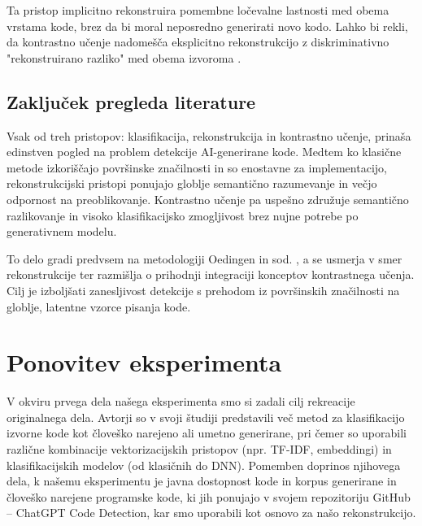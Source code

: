\documentclass[sigconf,nonacm]{acmart}
\begin{document}
Ta pristop implicitno rekonstruira pomembne ločevalne lastnosti med obema vrstama kode, brez da bi moral neposredno generirati novo kodo. Lahko bi rekli, da kontrastno učenje nadomešča eksplicitno rekonstrukcijo z diskriminativno "rekonstruirano razliko" med obema izvoroma \cite{guo2022unixcoder}.

\subsection{Zaključek pregleda literature}
Vsak od treh pristopov: klasifikacija, rekonstrukcija in kontrastno učenje, prinaša edinstven pogled na problem detekcije AI-generirane kode. Medtem ko klasične metode izkoriščajo površinske značilnosti in so enostavne za implementacijo, rekonstrukcijski pristopi ponujajo globlje semantično razumevanje in večjo odpornost na preoblikovanje. Kontrastno učenje pa uspešno združuje semantično razlikovanje in visoko klasifikacijsko zmogljivost brez nujne potrebe po generativnem modelu.

To delo gradi predvsem na metodologiji Oedingen in sod. \cite{oedingen2024chatgpt}, a se usmerja v smer rekonstrukcije ter razmišlja o prihodnji integraciji konceptov kontrastnega učenja. Cilj je izboljšati zanesljivost detekcije s prehodom iz površinskih značilnosti na globlje, latentne vzorce pisanja kode.

\section{Ponovitev eksperimenta}
V okviru prvega dela našega eksperimenta smo si zadali cilj rekreacije originalnega dela\cite{oedingen2024chatgpt}. Avtorji so v svoji študiji predstavili več metod za klasifikacijo izvorne kode kot človeško narejeno ali umetno generirane, pri čemer so uporabili različne kombinacije vektorizacijskih pristopov (npr. \acrshort{TF-IDF}, embeddingi) in klasifikacijskih modelov (od klasičnih do \acrshort{DNN}). Pomemben doprinos njihovega dela, k našemu eksperimentu je javna dostopnost kode in korpus generirane in človeško narejene programske kode, ki jih ponujajo v svojem repozitoriju GitHub – ChatGPT Code Detection, kar smo uporabili kot osnovo za našo rekonstrukcijo.
\end{document}
